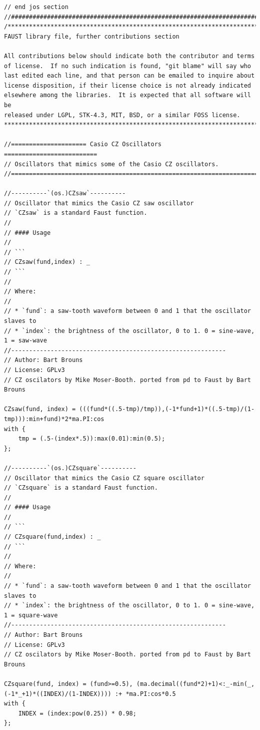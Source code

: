 \documentclass{article}
\begin{document}
\begin{lstlisting}[caption=\texttt{oscillators.lib}]
// end jos section
//########################################################################################
/************************************************************************
FAUST library file, further contributions section

All contributions below should indicate both the contributor and terms
of license.  If no such indication is found, "git blame" will say who
last edited each line, and that person can be emailed to inquire about
license disposition, if their license choice is not already indicated
elsewhere among the libraries.  It is expected that all software will be
released under LGPL, STK-4.3, MIT, BSD, or a similar FOSS license.
************************************************************************/

//===================== Casio CZ Oscillators ==========================
// Oscillators that mimics some of the Casio CZ oscillators.
//=====================================================================

//----------`(os.)CZsaw`----------
// Oscillator that mimics the Casio CZ saw oscillator
// `CZsaw` is a standard Faust function.
//
// #### Usage
//
// ```
// CZsaw(fund,index) : _
// ```
//
// Where:
//
// * `fund`: a saw-tooth waveform between 0 and 1 that the oscillator slaves to
// * `index`: the brightness of the oscillator, 0 to 1. 0 = sine-wave, 1 = saw-wave
//------------------------------------------------------------
// Author: Bart Brouns
// License: GPLv3
// CZ oscilators by Mike Moser-Booth. ported from pd to Faust by Bart Brouns

CZsaw(fund, index) = (((fund*((.5-tmp)/tmp)),(-1*fund+1)*((.5-tmp)/(1-tmp))):min+fund)*2*ma.PI:cos 
with {
	tmp = (.5-(index*.5)):max(0.01):min(0.5);
};

//----------`(os.)CZsquare`----------
// Oscillator that mimics the Casio CZ square oscillator
// `CZsquare` is a standard Faust function.
//
// #### Usage
//
// ```
// CZsquare(fund,index) : _
// ```
//
// Where:
//
// * `fund`: a saw-tooth waveform between 0 and 1 that the oscillator slaves to
// * `index`: the brightness of the oscillator, 0 to 1. 0 = sine-wave, 1 = square-wave
//------------------------------------------------------------
// Author: Bart Brouns
// License: GPLv3
// CZ oscilators by Mike Moser-Booth. ported from pd to Faust by Bart Brouns

CZsquare(fund, index) = (fund>=0.5), (ma.decimal((fund*2)+1)<:_-min(_,(-1*_+1)*((INDEX)/(1-INDEX)))) :+ *ma.PI:cos*0.5
with {
	INDEX = (index:pow(0.25)) * 0.98;
};


\end{lstlisting}
\end{document}
